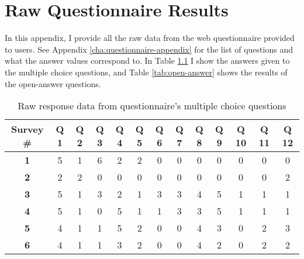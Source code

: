 \chapter{Raw Questionnaire Results}
\label{cha:raw-questionnaire-results}
In this appendix, I provide all the raw data from the web questionnaire
provided to users. See Appendix \ref{cha:questionnaire-appendix} for the list
of questions and what the answer values correspond to. In Table
\ref{tab:multiple-choice-answers} I show the answers given to the multiple
choice questions, and Table \ref{tab:open-answer} shows the results of the
open-answer questions.

\begin{table}[htbp]
  \begin{center}
    \begin{tabular} {|c||c|c|c|c|c|c|c|c|c|c|c|c|} \hline
      {\bf Survey \#} & {\bf Q 1} & {\bf Q 2} & {\bf Q 3} & {\bf Q 4} &
      {\bf Q 5} & {\bf Q 6} & {\bf Q 7} & {\bf Q 8} & {\bf Q 9} & {\bf Q 10} &
      {\bf Q 11} & {\bf Q 12}\\ \hline\hline
      {\bf 1} & 5 & 1 & 6 & 2 & 2 & 0 & 0 & 0 & 0 & 0 & 0 & 0\\ \hline
      {\bf 2} & 2 & 2 & 0 & 0 & 0 & 0 & 0 & 0 & 0 & 0 & 0 & 2\\ \hline
      {\bf 3} & 5 & 1 & 3 & 2 & 1 & 3 & 3 & 4 & 5 & 1 & 1 & 1\\ \hline
      {\bf 4} & 5 & 1 & 0 & 5 & 1 & 1 & 3 & 3 & 5 & 1 & 1 & 1\\ \hline
      {\bf 5} & 4 & 1 & 1 & 5 & 2 & 0 & 0 & 4 & 3 & 0 & 2 & 3\\ \hline
      {\bf 6} & 4 & 1 & 1 & 3 & 2 & 0 & 0 & 4 & 2 & 0 & 2 & 2\\ \hline
    \end{tabular}
    \caption{Raw response data from questionnaire's multiple choice questions}
    \label{tab:multiple-choice-answers}
  \end{center}
\end{table}

